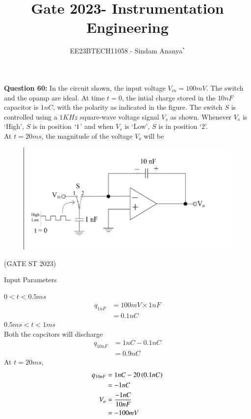 \documentclass[journal,12pt,twocolumn]{IEEEtran}
\theoremstyle{remark}
\begin{document}

\vspace{3cm}

\title{Gate 2023- Instrumentation Engineering}
\author{EE23BTECH11058 - Sindam Ananya$^{*}$%
}
\maketitle
\newpage
\bigskip

\renewcommand{\thefigure}{\theenumi}
\renewcommand{\thetable}{\theenumi}

\vspace{3cm}
\textbf{Question 60:} 
In the circuit shown, the input voltage $V_{in} = 100mV$. The switch and the opamp are ideal. At time $t=0$, the intial charge stored in the $10nF$ capacitor is $1nC$, with the polarity as indicated in the figure. The switch $S$ is controlled using a $1KHz$ square-wave voltage signal $V_s$ as shown. Whenever $V_s$ is `High', $S$ is in position $`1$' and when $V_s$ is `Low', $S$ is in position `$2$'.\\
At $t = 20ms$, the magnitude of the voltage $V_o$ will be  \\  
\begin{figure}[h!]
    \centering
    \includegraphics[width=\columnwidth]{figs/ingate60.png}
    \label{fig:ingate60}
\end{figure}
\hfill{(GATE ST 2023)}\\
\solution
\begin{table}[h!]
    \centering
    
    \caption{Input Parameters}
    \label{tab:gatein60table}
\end{table}
$ 0 < t < 0.5ms $
\begin{align}
q_{1nF} &= 100mV \times 1nF\\ 
        &= 0.1nC
\end{align}
$ 0.5ms < t < 1ms $\\
Both the capcitors will discharge
\begin{align}
q_{10nF} &= 1nC - 0.1nC\\
         &= 0.9nC
\end{align}
At $t = 20ms$,
\begin{align}
q_{10nF} &= 1nC - 20 \left(0.1nC\right)\\
         &= -1nC\\
V_o &= \frac{-1nC}{10nF}\\
    &= -100mV
\end{align}
\end{document}

